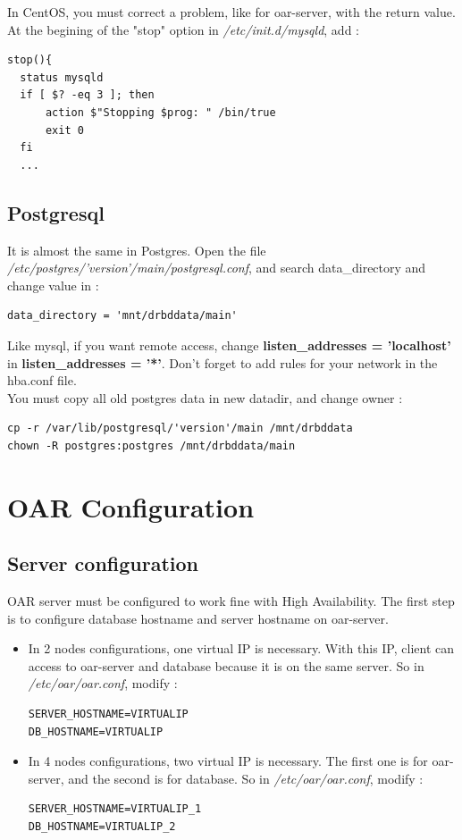\documentclass[a4paper,10pt]{report}
\begin{document}
In CentOS, you must correct a problem, like for oar-server, with the return value. At the begining of the "stop" option in \textit{/etc/init.d/mysqld}, add :
\begin{lstlisting}
stop(){
  status mysqld
  if [ $? -eq 3 ]; then
      action $"Stopping $prog: " /bin/true
      exit 0
  fi
  ...
\end{lstlisting}

\subsection{Postgresql}
It is almost the same in Postgres. Open the file \textit{/etc/postgres/'version'/main/postgresql.conf}, and search data\_directory and change value in :
\begin{lstlisting}
data_directory = 'mnt/drbddata/main'
\end{lstlisting}
Like mysql, if you want remote access, change \textbf{listen\_addresses = 'localhost'} in \textbf{listen\_addresses = '*'}. Don't forget to add rules for your network in the hba.conf file.\\
You must copy all old postgres data in new datadir, and change owner :
\begin{lstlisting}
cp -r /var/lib/postgresql/'version'/main /mnt/drbddata
chown -R postgres:postgres /mnt/drbddata/main
\end{lstlisting}



\section{OAR Configuration}
\subsection{Server configuration}
OAR server must be configured to work fine with High Availability. The first step is to configure database hostname and server hostname on oar-server.
\begin{itemize}
 \item In 2 nodes configurations, one virtual IP is necessary. With this IP, client can access to oar-server and database because it is on the same server.
So in \textit{/etc/oar/oar.conf}, modify :
\begin{lstlisting}
SERVER_HOSTNAME=VIRTUALIP
DB_HOSTNAME=VIRTUALIP
\end{lstlisting}
\item In 4 nodes configurations, two virtual IP is necessary. The first one is for oar-server, and the second is for database.
So in \textit{/etc/oar/oar.conf}, modify :
\begin{lstlisting}
SERVER_HOSTNAME=VIRTUALIP_1
DB_HOSTNAME=VIRTUALIP_2
\end{lstlisting}

\end{itemize}
\end{document}
